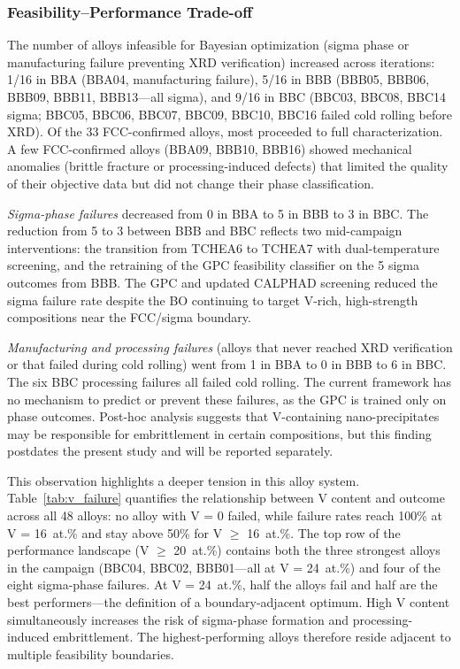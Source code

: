 \documentclass[preprint,12pt,times]{elsarticle}  %
\begin{document}
\subsubsection{Feasibility--Performance Trade-off}

The number of alloys infeasible for Bayesian optimization (sigma phase or manufacturing failure preventing XRD verification) increased across iterations: 1/16 in BBA (BBA04, manufacturing failure), 5/16 in BBB (BBB05, BBB06, BBB09, BBB11, BBB13---all sigma), and 9/16 in BBC (BBC03, BBC08, BBC14 sigma; BBC05, BBC06, BBC07, BBC09, BBC10, BBC16 failed cold rolling before XRD). Of the 33 FCC-confirmed alloys, most proceeded to full characterization. A few FCC-confirmed alloys (BBA09, BBB10, BBB16) showed mechanical anomalies (brittle fracture or processing-induced defects) that limited the quality of their objective data but did not change their phase classification.

\emph{Sigma-phase failures} decreased from 0 in BBA to 5 in BBB to 3 in BBC. The reduction from 5 to 3 between BBB and BBC reflects two mid-campaign interventions: the transition from TCHEA6 to TCHEA7 with dual-temperature screening, and the retraining of the GPC feasibility classifier on the 5 sigma outcomes from BBB. The GPC and updated CALPHAD screening reduced the sigma failure rate despite the BO continuing to target V-rich, high-strength compositions near the FCC/sigma boundary.

\emph{Manufacturing and processing failures} (alloys that never reached XRD verification or that failed during cold rolling) went from 1 in BBA to 0 in BBB to 6 in BBC. The six BBC processing failures all failed cold rolling. The current framework has no mechanism to predict or prevent these failures, as the GPC is trained only on phase outcomes. Post-hoc analysis suggests that V-containing nano-precipitates may be responsible for embrittlement in certain compositions, but this finding postdates the present study and will be reported separately.

This observation highlights a deeper tension in this alloy system. Table~\ref{tab:v_failure} quantifies the relationship between V content and outcome across all 48 alloys: no alloy with V = 0 failed, while failure rates reach 100\% at V = 16~at.\% and stay above 50\% for V $\geq$ 16~at.\%. The top row of the performance landscape (V $\geq$ 20~at.\%) contains both the three strongest alloys in the campaign (BBC04, BBC02, BBB01---all at V = 24~at.\%) and four of the eight sigma-phase failures. At V = 24~at.\%, half the alloys fail and half are the best performers---the definition of a boundary-adjacent optimum. High V content simultaneously increases the risk of sigma-phase formation and processing-induced embrittlement. The highest-performing alloys therefore reside adjacent to multiple feasibility boundaries.
\end{document}
